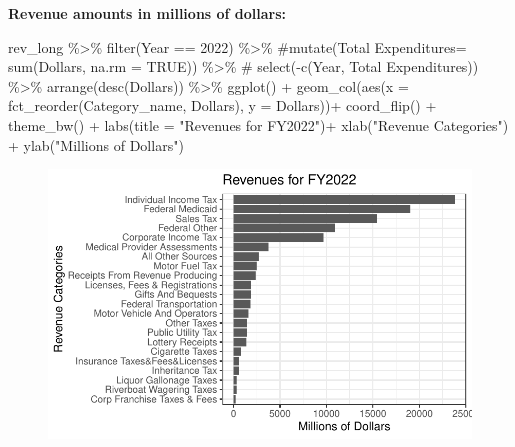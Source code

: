 \documentclass[
  letterpaper,
  DIV=11,
  numbers=noendperiod]{scrreport}
\newenvironment{Shaded}{\begin{snugshade}}{\end{snugshade}}
\newcommand{\AttributeTok}[1]{\textcolor[rgb]{0.40,0.45,0.13}{#1}}
\newcommand{\CommentTok}[1]{\textcolor[rgb]{0.37,0.37,0.37}{#1}}
\newcommand{\DecValTok}[1]{\textcolor[rgb]{0.68,0.00,0.00}{#1}}
\newcommand{\FunctionTok}[1]{\textcolor[rgb]{0.28,0.35,0.67}{#1}}
\newcommand{\NormalTok}[1]{\textcolor[rgb]{0.00,0.23,0.31}{#1}}
\newcommand{\SpecialCharTok}[1]{\textcolor[rgb]{0.37,0.37,0.37}{#1}}
\newcommand{\StringTok}[1]{\textcolor[rgb]{0.13,0.47,0.30}{#1}}
\begin{document}
\textbf{Revenue amounts in millions of dollars:}

\begin{Shaded}
\begin{Highlighting}[]
\NormalTok{rev\_long }\SpecialCharTok{\%\textgreater{}\%}
  \FunctionTok{filter}\NormalTok{(Year }\SpecialCharTok{==} \DecValTok{2022}\NormalTok{) }\SpecialCharTok{\%\textgreater{}\%}
  \CommentTok{\#mutate(\textasciigrave{}Total Expenditures\textasciigrave{}= sum(Dollars, na.rm = TRUE)) \%\textgreater{}\%}
 \CommentTok{\# select({-}c(Year, \textasciigrave{}Total Expenditures\textasciigrave{})) \%\textgreater{}\%}
  \FunctionTok{arrange}\NormalTok{(}\FunctionTok{desc}\NormalTok{(}\StringTok{\textasciigrave{}}\AttributeTok{Dollars}\StringTok{\textasciigrave{}}\NormalTok{)) }\SpecialCharTok{\%\textgreater{}\%}
  \FunctionTok{ggplot}\NormalTok{() }\SpecialCharTok{+} 
  \FunctionTok{geom\_col}\NormalTok{(}\FunctionTok{aes}\NormalTok{(}\AttributeTok{x =} \FunctionTok{fct\_reorder}\NormalTok{(Category\_name, }\StringTok{\textasciigrave{}}\AttributeTok{Dollars}\StringTok{\textasciigrave{}}\NormalTok{), }\AttributeTok{y =} \StringTok{\textasciigrave{}}\AttributeTok{Dollars}\StringTok{\textasciigrave{}}\NormalTok{))}\SpecialCharTok{+} 
  \FunctionTok{coord\_flip}\NormalTok{() }\SpecialCharTok{+}
    \FunctionTok{theme\_bw}\NormalTok{() }\SpecialCharTok{+}
      \FunctionTok{labs}\NormalTok{(}\AttributeTok{title =} \StringTok{"Revenues for FY2022"}\NormalTok{)}\SpecialCharTok{+}
    \FunctionTok{xlab}\NormalTok{(}\StringTok{"Revenue Categories"}\NormalTok{) }\SpecialCharTok{+}
  \FunctionTok{ylab}\NormalTok{(}\StringTok{"Millions of Dollars"}\NormalTok{)}
\end{Highlighting}
\end{Shaded}

\begin{figure}[H]

{\centering \includegraphics{./Everything_files/figure-pdf/unnamed-chunk-27-1.pdf}

}

\end{figure}
\end{document}
